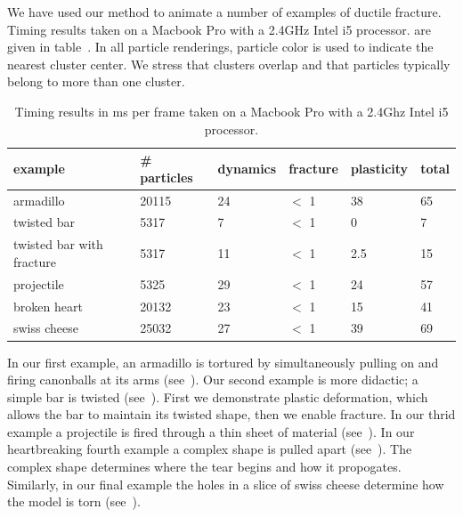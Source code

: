 \documentclass[review]{acmsiggraph}
\begin{document}
We have used our method to animate a number of examples of ductile fracture.  Timing results
taken on a Macbook Pro with a 2.4GHz Intel i5 processor.
are given in table~.
In all particle renderings, particle color is used to indicate the nearest cluster center.  
We stress that clusters overlap and that particles typically belong to more than one cluster.

\begin{table}
\begin{center}
\caption{Timing results in ms per frame taken on a Macbook Pro with a 2.4Ghz Intel i5 processor.}
\label{table:timing}
\begin{tabular}{|l|l|l|l|l|l|}
\hline
example & \# particles & dynamics & fracture & plasticity & total\\
\hline
armadillo & 20115 & 24  & $<$ 1 & 38 & 65\\
twisted bar & 5317 & 7 & $<$ 1  & 0 & 7\\
twisted bar with fracture & 5317 & 11  & $<$ 1 & 2.5 & 15 \\
projectile & 5325 & 29 & $<$ 1 & 24 & 57\\
broken heart & 20132 & 23 & $<$ 1 & 15 & 41\\
swiss cheese & 25032 & 27 & $<$ 1 & 39 & 69 \\
\hline
\end{tabular}
\end{center}
\end{table}

In our first example, an armadillo is tortured by simultaneously pulling on and firing
canonballs at its arms (see~).
Our second example is more didactic; a simple bar is twisted (see~).  First we demonstrate 
plastic deformation, which allows the bar to maintain its twisted shape, then we enable fracture. 
In our thrid example a projectile is fired through a thin sheet of material (see~).  
In our heartbreaking fourth example a complex shape is pulled apart (see~).  The complex shape determines
where the tear begins and how it propogates.  Similarly, in our final example the holes in a 
slice of swiss cheese determine how the model is torn (see~).


\end{document}
